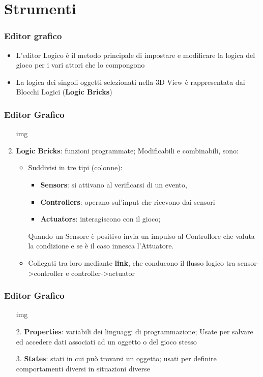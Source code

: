 \documentclass{beamer}
\begin{document}
	\section{Strumenti}
		\begin{frame}
			\frametitle{Editor grafico}
			\begin{itemize}
				\item L'editor Logico è il metodo principale di impostare e modificare la logica del gioco per i vari attori che lo compongono
				\item La logica dei singoli oggetti selezionati nella 3D View è rappresentata dai Blocchi Logici (\textbf{Logic Bricks})
			\end{itemize}
		\end{frame}
		\begin{frame}
			\frametitle{Editor Grafico}
			\begin{enumerate}
			\item [img]
				\item \textbf{Logic Bricks}: funzioni programmate; Modificabili e combinabili, sono:
					\begin{itemize}
						\item Suddivisi in tre tipi (colonne): 
						\begin{itemize}
							\item\textbf{Sensors}: si attivano al verificarsi di un evento, 
							\item \textbf{Controllers}: operano sul'input che ricevono dai sensori
							\item \textbf{Actuators}: interagiscono con il gioco;
						\end{itemize}
						Quando un Sensore è positivo invia un impulso al Controllore che valuta la condizione e se è il caso innesca l’Attuatore.
						\item Collegati tra loro mediante \textbf{link}, che conducono il flusso logico tra sensor->controller e controller->actuator
					\end{itemize}
			\end{enumerate}
		\end{frame}
		\begin{frame}
			\frametitle{Editor Grafico}
			\begin{itemize}
			\item [img]
				\item[2.] \textbf{Properties}: variabili dei linguaggi di programmazione; Usate per salvare ed accedere dati associati ad un oggetto o del gioco stesso
				\item[3.] \textbf{States}: stati in cui può trovarsi un oggetto; usati per definire comportamenti diversi in situazioni diverse %
			\end{itemize}
		\end{frame}
\end{document}
